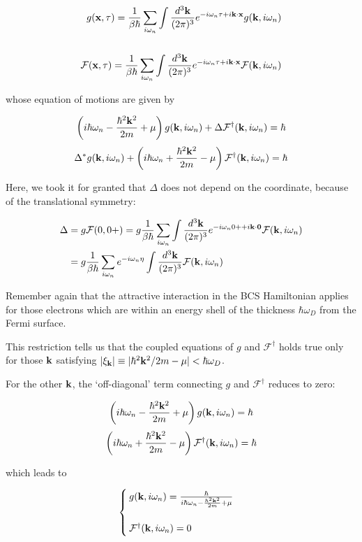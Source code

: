 \[\begin{split}
g({\bf x},\tau) = \frac{1}{\beta\hbar}\sum_{i\omega_n}\int\frac{d^3\bf k}{(2\pi)^3}e^{-i\omega_n\tau+i\bf k\cdot x}g({\bf k},i\omega_n)\\
\ \\
\mathcal{F}({\bf x},\tau) = \frac{1}{\beta\hbar}\sum_{i\omega_n}\int\frac{d^3\bf k}{(2\pi)^3}e^{-i\omega_n\tau+i\bf k\cdot x}\mathcal{F}({\bf k},i\omega_n)\\
\end{split}\]

whose equation of motions are given by

\[\left(i\hbar\omega_n-\frac{\hbar^2{\bf k}^2}{2m}+\mu\right)g({\bf k},i\omega_n)+\Delta\mathcal{F}^\dagger({\bf k},i\omega_n)=\hbar\]
\[\Delta^*g({\bf k},i\omega_n)+\left(i\hbar\omega_n+\frac{\hbar^2{\bf k}^2}{2m}-\mu\right)\mathcal{F}^\dagger({\bf k},i\omega_n)=\hbar\]

Here, we took it for granted that $\Delta$ does not depend on the coordinate, because of the translational symmetry:

\[\begin{split}
\Delta&=g\mathcal{F}(0,0+)=g\frac{1}{\beta\hbar}\sum_{i\omega_n}\int\frac{d^3\bf k}{(2\pi)^3}e^{-i\omega_n0++i\bf k\cdot 0}\mathcal{F}({\bf k},i\omega_n)\\
&=g\frac{1}{\beta\hbar}\sum_{i\omega_n} e^{-i\omega_n\eta}\int\frac{d^3\bf k}{(2\pi)^3}\mathcal{F}({\bf k},i\omega_n)
\end{split}\]

Remember again that the attractive interaction in the BCS Hamiltonian applies for those electrons which are within an energy shell of the thickness $\hbar\omega_D$ from the Fermi surface. 

This restriction tells us that the coupled equations of $g$ and $\mathcal{F}^\dagger$ holds true only for those $\bf k$ satisfying $|\xi_{\bf k}|\equiv|\hbar^2{\bf k}^2/2m - \mu|<\hbar\omega_D$. 

For the other ${\bf k}$, the `off-diagonal' term connecting $g$ and $\mathcal{F}^\dagger$ reduces to zero:

\[\left(i\hbar\omega_n-\frac{\hbar^2{\bf k}^2}{2m}+\mu\right)g({\bf k},i\omega_n)=\hbar\]
\[\left(i\hbar\omega_n+\frac{\hbar^2{\bf k}^2}{2m}-\mu\right)\mathcal{F}^\dagger({\bf k},i\omega_n)=\hbar\]

which leads to

\[\begin{cases}
g({\bf k},i\omega_n)=\frac{\hbar}{i\hbar\omega_n-\frac{\hbar^2{\bf k}^2}{2m}+\mu}\\
\ \\
\mathcal{F}^\dagger({\bf k},i\omega_n) = 0
\end{cases}\]

